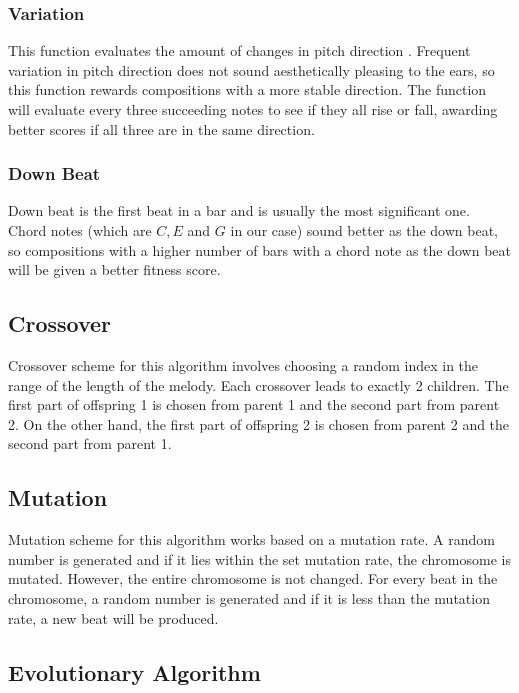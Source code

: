 \documentclass[conference]{IEEEtran}
\begin{document}
\subsubsection{Variation}
This function evaluates the amount of changes in pitch direction \cite{b2}. Frequent variation in pitch direction does not sound aesthetically pleasing to the ears, so this function rewards compositions with a more stable direction. The function will evaluate every three succeeding notes to see if they all rise or fall, awarding better scores if all three are in the same direction.

\subsubsection{Down Beat}
Down beat is the first beat in a bar and is usually the most significant one. Chord notes (which are $C, E$ and $G$ in our case) sound better as the down beat, so compositions with a higher number of bars with a chord note as the down beat will be given a better fitness score.

\subsection{Crossover}
Crossover scheme for this algorithm involves choosing a random index in the range of the length of the melody. Each crossover leads to exactly 2 children. The first part of offspring 1 is chosen from parent 1 and the second part from parent 2. On the other hand, the first part of offspring 2 is chosen from parent 2 and the second part from parent 1.

\subsection{Mutation}
Mutation scheme for this algorithm works based on a mutation rate. A random number is generated and if it lies within the set mutation rate, the chromosome is mutated. However, the entire chromosome is not changed. For every beat in the chromosome, a random number is generated and if it is less than the mutation rate, a new beat will be produced.

\subsection{Evolutionary Algorithm}
\end{document}

